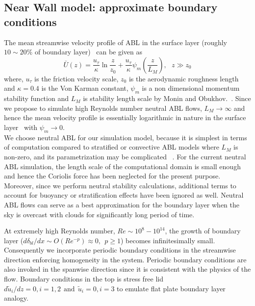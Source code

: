 \documentclass[times]{fldauth}
\begin{document}
\subsection{Near Wall model: approximate boundary conditions}\label{nwm}
 The mean streamwise velocity profile of ABL  in the surface layer (roughly $10 \sim 20\%$ of boundary layer)~\cite{basin,porte1fun,meyers} can be given as
\begin{equation}
\bar{U}(z) = \frac{u_{\tau}}{\kappa}\ln \frac{z}{z_0} + \frac{u_{\tau}}{\kappa}\psi_m(\frac{z}{L_M}),\ \ \  z \gg z_0  \label{logvel}
\end{equation}
where, $u_\tau$ is the friction velocity scale, $z_0$ is the aerodynamic roughness length and $\kappa = 0.4$ is the Von Karman constant, $\psi_m$ is a non dimensional momentum stability function and $L_M$ is stability length scale by Monin and Obukhov.~\cite{obu,basin}. Since we propose to simulate high Reynolds number neutral ABL flows, $L_M\rightarrow \infty$ and hence the mean velocity profile is essentially logarithmic in nature in the surface layer~\cite{obu,porte1fun,meyers2} with $\psi_m \rightarrow 0$.\\
 We choose neutral ABL for our simulation model, because it is simplest in terms of computation compared to stratified or convective ABL models where $L_M$ is non-zero, and its parametrization may be complicated ~\cite{moeng1,basin}. For the current neutral ABL simulation, the length scale of the computational domain is small enough and hence the Coriolis force has been neglected for the present purpose. Moreover, since we perform neutral stability calculations, additional terms to account for buoyancy or stratification effects have been ignored as well. Neutral ABL flows can serve as a best approximation for the boundary layer when the sky is overcast with clouds for significantly long period of time. \\
\par
At extremely high Reynolds number, $Re \sim 10^8- 10^{14}$, the growth of boundary layer ($d\delta_{bl}/dx \sim O(Re^{-p})\approx 0,\ \ p \geqslant 1$) becomes infinitesimally small. Consequently we incorporate periodic boundary conditions in the streamwise direction enforcing homogeneity in the system. Periodic boundary conditions are also invoked in the spanwise direction since it is consistent with the physics of the flow. Boundary conditions in the top is stress free lid $d\widetilde{u}_{i}/dz = 0, i = 1,2\ \ \mbox{and} \ \ \widetilde{u}_{i} = 0, i = 3$ to emulate flat plate boundary layer analogy.\\
\end{document}
